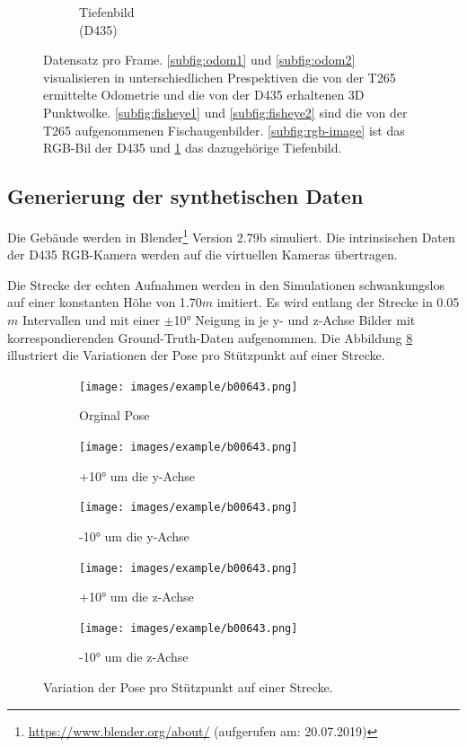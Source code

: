 \begin{figure}[H]
\begin{subfigure}[t]{0.3\linewidth}
		\caption{Tiefenbild \\ (D435) \hspace*{2cm}}
		\label{subfig:depth-image}
	\end{subfigure}
	\caption{Datensatz pro Frame. \ref{subfig:odom1}  und \ref{subfig:odom2} visualisieren in unterschiedlichen Prespektiven die von der T265 ermittelte Odometrie und die von der D435 erhaltenen 3D Punktwolke. \ref{subfig:fisheye1} und \ref{subfig:fisheye2} sind die von der T265 aufgenommenen Fischaugenbilder. \ref{subfig:rgb-image} ist das RGB-Bil der D435 und \ref{subfig:depth-image} das dazugehörige Tiefenbild. }
	\label{fig:dataset}
\end{figure}


\subsection{Generierung der synthetischen Daten}
\label{subsec:generate_synth_images}

Die Gebäude werden in Blender\footnote{\url{https://www.blender.org/about/} (aufgerufen am: 20.07.2019)} Version 2.79b simuliert. Die intrinsischen Daten der D435 RGB-Kamera werden auf die virtuellen Kameras übertragen.

Die Strecke der echten Aufnahmen werden in den Simulationen schwankungslos auf einer konstanten Höhe von 1.70$m$ imitiert. Es wird entlang der Strecke in 0.05$m$ Intervallen und mit einer $\pm$10° Neigung in je y- und z-Achse Bilder mit korrespondierenden Ground-Truth-Daten aufgenommen. Die Abbildung \ref{fig:dataset_variation} illustriert die Variationen der Pose pro Stützpunkt auf einer Strecke.


\begin{figure}[H]
	\centering
	\begin{subfigure}[t]{0.18\linewidth}
		\centering
		\texttt{[image: images/example/b00643.png]}
		\caption{Orginal Pose \vspace{\fill}}
		\label{subfig:iz0_y0}
	\end{subfigure}
	\hfill
	\begin{subfigure}[t]{0.18\linewidth}
		\centering
		\texttt{[image: images/example/b00643.png]}
		\caption{+10° um die y-Achse}
		\label{subfig:iz0_y+10}
	\end{subfigure}
	\hfill 
	\begin{subfigure}[t]{0.18\linewidth}
		\centering
		\texttt{[image: images/example/b00643.png]}
		\caption{-10° um die y-Achse}
		\label{subfig:iz0_y-10}
	\end{subfigure}
	\hfill
	\begin{subfigure}[t]{0.18\linewidth}
		\centering
		\texttt{[image: images/example/b00643.png]}
		\caption{+10° um die z-Achse}
		\label{subfig:iz+10_y0}
	\end{subfigure}
	\hfill
	\begin{subfigure}[t]{0.18\linewidth}
		\centering
		\texttt{[image: images/example/b00643.png]}
		\caption{-10° um die z-Achse}
		\label{subfig:iz-10_y0}
	\end{subfigure}
	\caption{Variation der Pose pro Stützpunkt auf einer Strecke.}
	\label{fig:dataset_variation}
\end{figure}

